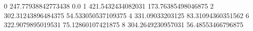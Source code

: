 0 247.77938842773438 0.0
1 421.5432434082031 173.76385498046875
2 302.31243896484375 54.533050537109375
4 331.09033203125 83.31094360351562
6 322.9079895019531 75.12860107421875
8 304.2649230957031 56.48553466796875
